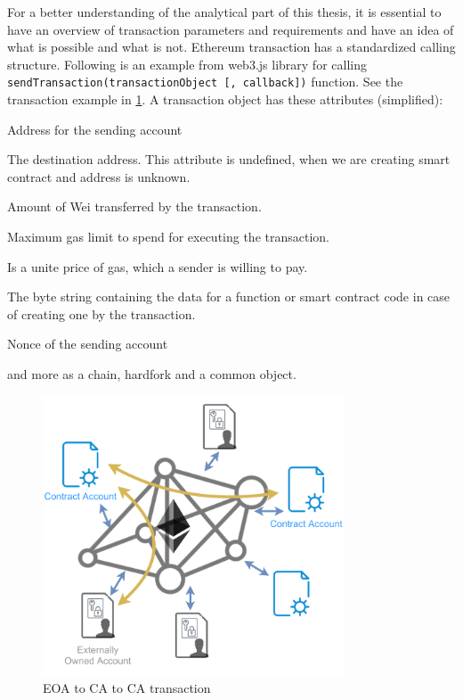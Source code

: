 \documentclass[thesis=M,english]{FITthesis}[2019/12/23]
\begin{document}
For a better understanding of the analytical part of this thesis, it is essential to have an overview of transaction parameters and requirements and have an idea of what is possible and what is not. Ethereum transaction has a standardized calling structure. Following is an example from web3.js\cite{web3js} library for calling \texttt{sendTransaction(transactionObject [, callback])} function. See the transaction example in \ref{fig:AccountCommunication}. A transaction object has these attributes (simplified):
\begin{description}

\item[from:] Address for the sending account
\item[to:] The destination address. This attribute is undefined, when we are creating smart contract and address is unknown.
\item[value:] Amount of Wei transferred by the transaction.
\item[gas:] Maximum gas limit to spend for executing the transaction. 
\item[gasPrice:] Is a unite price of gas, which a sender is willing to pay. 
\item[data:] The byte string containing the data for a function or smart contract code in case of creating one by the transaction.
\item[nonce:] Nonce of the sending account
\item and more as a chain, hardfork and a common object.
\end{description}

\begin{figure}[ht!]
    \centering
    \includegraphics[width=0.8\textwidth]{assets/Accounts.pdf}
    \caption{EOA to CA to CA transaction \cite{Singhal2018} }
    \label{fig:AccountCommunication}
\end{figure}
\end{document}
